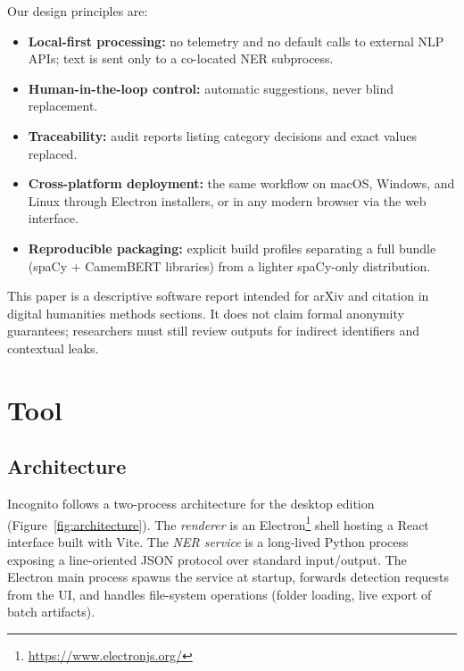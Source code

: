 \documentclass[11pt,a4paper]{article}
\begin{document}
Our design principles are:
\begin{itemize}[noitemsep]
  \item \textbf{Local-first processing:} no telemetry and no default calls to
        external NLP APIs; text is sent only to a co-located NER subprocess.
  \item \textbf{Human-in-the-loop control:} automatic suggestions, never blind
        replacement.
  \item \textbf{Traceability:} audit reports listing category decisions and exact
        values replaced.
  \item \textbf{Cross-platform deployment:} the same workflow on macOS, Windows,
        and Linux through Electron installers, or in any modern browser via the
        web interface.
  \item \textbf{Reproducible packaging:} explicit build profiles separating a
        full bundle (spaCy + CamemBERT libraries) from a lighter spaCy-only
        distribution.
\end{itemize}

This paper is a descriptive software report intended for arXiv and citation in
digital humanities methods sections.
It does not claim formal anonymity guarantees; researchers must still review outputs
for indirect identifiers and contextual leaks.

\section{Tool}
\label{sec:tool}

\subsection{Architecture}

Incognito follows a two-process architecture for the desktop edition
(Figure~\ref{fig:architecture}).
The \emph{renderer} is an Electron\footnote{\url{https://www.electronjs.org/}} shell
hosting a React interface built with Vite.
The \emph{NER service} is a long-lived Python process exposing a line-oriented JSON
protocol over standard input/output.
The Electron main process spawns the service at startup, forwards detection requests
from the UI, and handles file-system operations (folder loading, live export of batch
artifacts).
\end{document}
